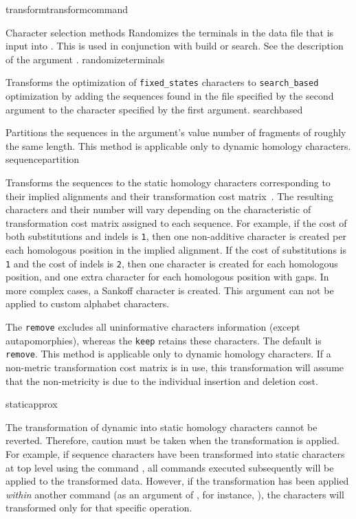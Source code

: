 \begin{command}{transform}{transformcommand}
\begin{arguments}
\begin{argumentgroup}{Character selection methods}
{Randomizes the terminals in the data file that is input into \poy. This is used in conjunction with 
build or search. See the description of the argument .}
{randomizeterminals}

{Transforms the optimization of \texttt{fixed\_states} characters to \texttt{search\_based}
optimization \cite{wheeler2003b} by adding the sequences found in the file specified by the second 
argument to the character specified by the first argument.}
{searchbased}

{Partitions the sequences in the argument's value number of
fragments of roughly the same length. This method is applicable only to dynamic homology characters.}
{sequencepartition}

{Transforms the sequences to the static homology characters
corresponding to their implied alignments and their transformation
cost matrix~\cite{wheeler2003}. The resulting characters and their number will vary
depending on the characteristic of transformation cost matrix
assigned to each sequence. For example, if the cost of both substitutions
and indels is \texttt{1}, then one non-additive character is created per
each homologous position in the implied alignment. If the cost of
substitutions is \texttt{1} and the cost of indels is \texttt{2}, then
one character is created for each homologous position, and one extra character for
each homologous position with gaps. In more complex cases, a Sankoff character is
created. This argument can not be applied to custom alphabet characters.

\setlength{\parindent}{0.5cm}                
\indent 
The \poylident \texttt{remove} excludes all uninformative characters
information (except autapomorphies), whereas the \poylident \texttt{keep}
retains these characters. The default is \texttt{remove}. This
method is applicable only to dynamic homology characters. If
a non-metric transformation cost matrix is in use, this
transformation will assume that the non-metricity is due to the
individual insertion and deletion cost.}
{staticapprox}

\begin{statement}
The transformation of dynamic into static homology characters cannot be reverted.
Therefore, caution must be taken when the transformation is applied. For example,
if sequence characters have been transformed into static characters at top level using
the command , all commands executed 
subsequently will be applied to the transformed data. However, if the transformation has 
been applied \emph{within} another command (as an argument of , 
for instance, ), the characters will 
transformed only for that specific operation.
\end{statement}




\end{argumentgroup}
\end{arguments}
\end{command}

